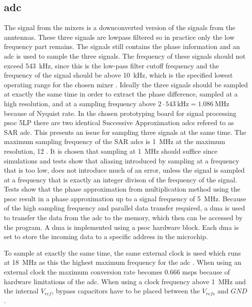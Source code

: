 \subsection{\gls{adc}} \label{sec:adc}
The signal from the mixers is a downconverted version of the signals from the anntennas. These three signals are lowpass filtered so in practice only the low frequency part remains. The signals still contains the phase information and an \gls{adc} is used to sample the three signals. The frequency of these signals should not exceed \SI{543}{\kilo\hertz}, since this is the low-pass filter cutoff frequency and the frequency of the signal should be above \SI{10}{\kilo\hertz}, which is the specified lowest operating range for the chosen mixer \citep{datasheet:LT5560}. Ideally the three signals should be sampled at exactly the same time in order to extract the phase difference, sampled at a high resolution, and at a sampling frequency above $2\cdot\SI{543}{\kilo\hertz} = \SI{1.086}{\mega\hertz}$ because of Nyquist rate.
In the chosen prototyping board for signal processing \gls{psoc} 5LP there are two identical Successive Approximation \glspl{adc} \cite{datasheet:PSoC5LP:_CY8C58LP_Family} refered to as SAR \gls{adc}. This presents an issue for sampling three signals at the same time. The maximum sampling frequency of the SAR \glspl{adc} is \SI{1}{\mega\hertz} at the maximum resolution, \SI{12}{\bit} \citep{datasheet:PSoC5LP:_CY8C58LP_Family}.
It is chosen that sampling at \SI{1}{\mega\hertz} should suffice since simulations and tests show that aliasing introduced by sampling at a frequency that is too low, does not introduce much of an error, unless the signal is sampled at a frequency that is exactly an integer divison of the frequency of the signal. Tests show that the phase approximation from multiplication method using the \gls{psoc} result in a phase approximation up to a signal frequency of \SI{5}{\mega\hertz}. 
Because of the high sampling frequency and parallel data transfer required, a \gls{dma} is used to transfer the data from the \gls{adc} to the memory, which then can be accessed by the program. A \gls{dma} is implemented using a \gls{psoc} hardware block. Each \gls{dma} is set to store the incoming data to a specific address in the microchip.

To sample at exactly the same time, the same external clock is used which runs at \SI{18}{\mega\hertz} as this the highest maximum frequency for the \gls{adc} \citep{datasheet:PSoC5LP:_CY8C58LP_Family}. When using an external clock the maximum conversion rate becomes \SI{0.666}{} \gls{msps} because of hardware limitations of the \gls{adc}. When using a clock frequency above \SI{1}{\mega\hertz} and the internal $V_{ref}$, bypass capacitors have to be placed between the $V_{refs}$ and $GND$ \citep{datasheet:saradc}.

